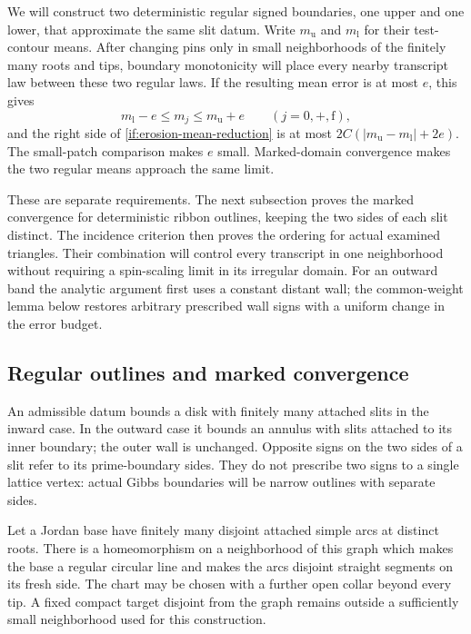 We will construct two deterministic regular signed boundaries, one
upper and one lower, that approximate the same slit datum. Write
$m_{\mathrm u}$ and $m_{\mathrm l}$ for their test-contour means.
After changing pins only in small neighborhoods of the finitely many
roots and tips, boundary monotonicity will place every nearby
transcript law between these two regular laws. If the resulting
mean error is at most $e$, this gives
\[
       m_{\mathrm l}-e\le m_j\le m_{\mathrm u}+e
              \qquad(j=0,+,\mathrm f),
\]
and the right side of \eqref{if:erosion-mean-reduction} is at most
$2C(|m_{\mathrm u}-m_{\mathrm l}|+2e)$. The small-patch comparison
makes $e$ small. Marked-domain convergence makes the two regular
means approach the same limit.

These are separate requirements. The next subsection proves the
marked convergence for deterministic ribbon outlines, keeping the
two sides of each slit distinct. The incidence criterion then proves
the ordering for actual examined triangles. Their combination will
control every transcript in one neighborhood without requiring a
spin-scaling limit in its irregular domain. For an outward band the
analytic argument first uses a constant distant wall; the common-weight
lemma below restores arbitrary prescribed wall signs with a uniform
change in the error budget.

\subsection{Regular outlines and marked convergence}

An admissible datum bounds a disk with finitely many attached slits in
the inward case.  In the outward case it bounds an annulus with slits
attached to its inner boundary; the outer wall is unchanged.  Opposite
signs on the two sides of a slit refer to its prime-boundary sides.
They do not prescribe two signs to a single lattice vertex: actual
Gibbs boundaries will be narrow outlines with separate sides.

\begin{lemma}\label{if:chart}
Let a Jordan base have finitely many disjoint attached simple arcs at
distinct roots.  There is a homeomorphism on a neighborhood of this
graph which makes the base a regular circular line and makes the arcs
disjoint straight segments on its fresh side.  The chart may be chosen
with a further open collar beyond every tip.  A fixed compact target
disjoint from the graph remains outside a sufficiently small
neighborhood used for this construction.
\end{lemma}

